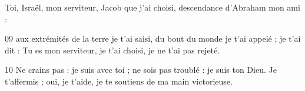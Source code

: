 Toi, Israël, mon serviteur, Jacob que j’ai choisi, descendance d’Abraham mon ami :

09 aux extrémités de la terre je t’ai saisi, du bout du monde je t’ai appelé ; je t’ai dit : Tu es mon serviteur, je t’ai choisi, je ne t’ai pas rejeté.

10 Ne crains pas : je suis avec toi ; ne sois pas troublé : je suis ton Dieu. Je t’affermis ; oui, je t’aide, je te soutiens de ma main victorieuse.
